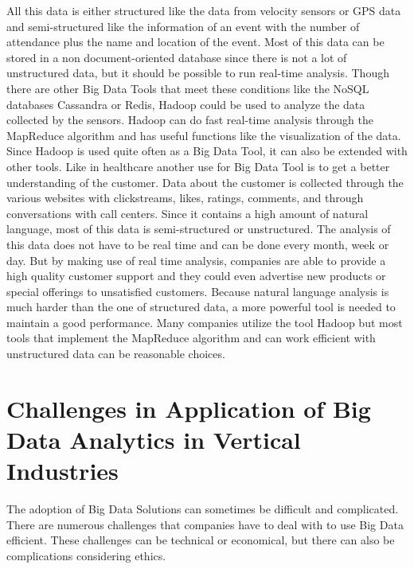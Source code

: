 \documentclass[runningheads]{llncs}
\begin{document}
All this data is either structured like the data from velocity sensors or GPS data and semi-structured like the information of an event with the number of attendance plus the name and location of the event.
Most of this data can be stored in a non document-oriented database since there is not a lot of unstructured data,  but it should be possible to run real-time analysis. Though there are other Big Data Tools that meet these conditions like the NoSQL databases Cassandra or Redis, Hadoop could be used to analyze the data collected by the sensors. Hadoop can do fast real-time analysis through the MapReduce algorithm and has useful functions like the visualization of the data. Since Hadoop is used quite often as a Big Data Tool, it can also be extended with other tools.
Like in healthcare another use for Big Data Tool is to get a better understanding of the customer. Data about the customer is collected through the various websites with clickstreams, likes, ratings, comments, and through conversations with call centers. Since it contains a high amount of natural language, most of this data is semi-structured or unstructured. The analysis of this data does not have to be real time and can be done every month, week or day. But by making use of real time analysis, companies are able to provide a high quality customer support and they could even advertise new products or special offerings to unsatisfied customers. Because natural language analysis is much harder than the one of structured data, a more powerful tool is needed to maintain a good performance. Many companies utilize the tool Hadoop but most tools that implement the MapReduce algorithm and can work efficient with unstructured data can be reasonable choices.

\section{Challenges in Application of Big Data Analytics in Vertical Industries}
The adoption of Big Data Solutions can sometimes be difficult and complicated. There are numerous challenges that companies have to deal with to use Big Data efficient. These challenges can be technical or economical, but there can also be complications considering ethics. 
\end{document}
